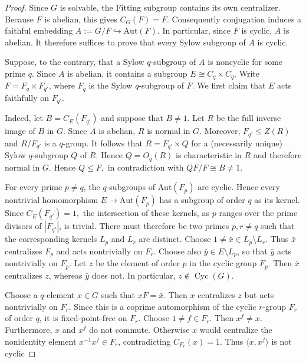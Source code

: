 \documentclass[10pt,a4paper]{amsart}
\newcommand{\CG}[2]{C_{#1}(#2)}
\newcommand{\cyc}{\operatorname{Cyc}}
\begin{document}
\begin{proof}
Since $G$ is solvable, the Fitting subgroup contains its own
centralizer. Because $F$ is abelian, this gives
$
   \CG{G}{F}=F.
$
Consequently conjugation induces a faithful embedding
$
   A:=G/F\hookrightarrow \text{Aut}(F).
$
In particular, since $F$ is cyclic, $A$ is abelian.  It therefore suffices to prove that every
Sylow subgroup of $A$ is cyclic.

Suppose, to the contrary, that a Sylow $q$-subgroup of $A$ is noncyclic for
some prime $q$.  Since $A$ is abelian, it contains a subgroup
$
   E\cong C_q\times C_q.
$
Write $F=F_q\times F_{q'}$, where $F_q$ is the Sylow $q$-subgroup of $F$.
We first claim that $E$ acts faithfully on $F_{q'}$.

Indeed, let
$ B=\CG{E}{F_{q'}}$
and suppose that $B\ne 1$.  Let $R$ be the full inverse image of $B$ in $G$.
Since $A$ is abelian, $R$ is normal in $G$.  Moreover, $F_{q'}\le Z(R)$ and
$R/F_{q'}$ is a $q$-group.  It follows that
$R=F_{q'}\times Q$
for a (necessarily unique) Sylow $q$-subgroup $Q$ of $R$.  Hence
$Q=O_{q}(R)$ is characteristic in $R$ and therefore normal in $G$. 
Hence $Q\leq F,$ in contradiction with $QF/F\cong B\ne 1$.

For every prime $p\ne q$, the $q$-subgroups of
$\text{Aut}(F_p)$ are cyclic.  Hence
every nontrivial homomorphism
$  E\longrightarrow\text{Aut}(F_p)
$
has a subgroup of order $q$ as its kernel.  Since $\CG{E}{F_{q'}}=1,$
the intersection of these
kernels, as $p$ ranges over the prime divisors of $|F_{q'}|$, is trivial.
There must therefore be two primes $p,r\ne q$ such that the corresponding
kernels $L_p$ and $L_r$ are distinct.
Choose
$1\ne \bar{x}\in L_p\setminus L_r.
$
Thus $\bar{x}$ centralizes $F_p$ and acts nontrivially on $F_r$. Choose also
$\bar{y}\in E\setminus L_p$, so that $\bar{y}$ acts nontrivially on $F_p$.
Let $z$ be the element of order $p$ in the cyclic group $F_p$. Then
$\bar{x}$ centralizes $z$, whereas $\bar{y}$ does not.  In particular,
$z\notin\cyc(G).
$

Choose a $q$-element $x\in G$ such that $xF=\bar x.$  Then $x$ centralizes
$z$ but acts nontrivially on $F_r$.  Since this is a
coprime automorphism of the cyclic $r$-group $F_r$ of order $q$, it is
fixed-point-free on $F_r$.  Choose $1\ne f\in F_r$.  Then
$
   x^f\ne x.
$
Furthermore, $x$ and $x^f$ do not commute.  Otherwise $x$ would centralize
the nonidentity element $x^{-1}x^f\in F_r$, contradicting
$C_{F_r}(x)=1$.  Thus
$\langle x,x^f\rangle$ is not cyclic


\end{proof}
\end{document}
